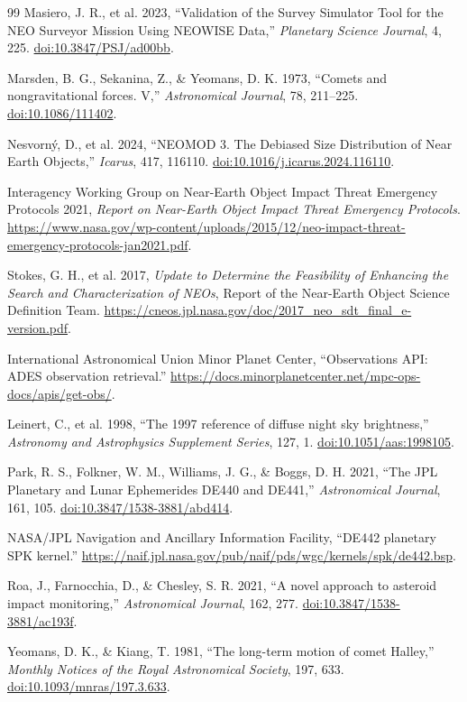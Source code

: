 \begin{thebibliography}{99}
Masiero, J. R., et al. 2023,
``Validation of the Survey Simulator Tool for the NEO Surveyor Mission Using
NEOWISE Data,''
\textit{Planetary Science Journal}, 4, 225.
\href{https://doi.org/10.3847/PSJ/ad00bb}{doi:10.3847/PSJ/ad00bb}.

Marsden, B. G., Sekanina, Z., \& Yeomans, D. K. 1973,
``Comets and nongravitational forces. V,''
\textit{Astronomical Journal}, 78, 211--225.
\href{https://doi.org/10.1086/111402}{doi:10.1086/111402}.

Nesvorn\'y, D., et al. 2024,
``NEOMOD 3. The Debiased Size Distribution of Near Earth Objects,''
\textit{Icarus}, 417, 116110.
\href{https://doi.org/10.1016/j.icarus.2024.116110}{doi:10.1016/j.icarus.2024.116110}.

Interagency Working Group on Near-Earth Object Impact Threat Emergency
Protocols 2021,
\textit{Report on Near-Earth Object Impact Threat Emergency Protocols}.
\url{https://www.nasa.gov/wp-content/uploads/2015/12/neo-impact-threat-emergency-protocols-jan2021.pdf}.

Stokes, G. H., et al. 2017,
\textit{Update to Determine the Feasibility of Enhancing the Search and
Characterization of NEOs},
Report of the Near-Earth Object Science Definition Team.
\url{https://cneos.jpl.nasa.gov/doc/2017_neo_sdt_final_e-version.pdf}.

International Astronomical Union Minor Planet Center,
``Observations API: ADES observation retrieval.''
\url{https://docs.minorplanetcenter.net/mpc-ops-docs/apis/get-obs/}.

Leinert, C., et al. 1998,
``The 1997 reference of diffuse night sky brightness,''
\textit{Astronomy and Astrophysics Supplement Series}, 127, 1.
\href{https://doi.org/10.1051/aas:1998105}{doi:10.1051/aas:1998105}.

Park, R. S., Folkner, W. M., Williams, J. G., \& Boggs, D. H. 2021,
``The JPL Planetary and Lunar Ephemerides DE440 and DE441,''
\textit{Astronomical Journal}, 161, 105.
\href{https://doi.org/10.3847/1538-3881/abd414}{doi:10.3847/1538-3881/abd414}.

NASA/JPL Navigation and Ancillary Information Facility,
``DE442 planetary SPK kernel.''
\url{https://naif.jpl.nasa.gov/pub/naif/pds/wgc/kernels/spk/de442.bsp}.

Roa, J., Farnocchia, D., \& Chesley, S. R. 2021,
``A novel approach to asteroid impact monitoring,''
\textit{Astronomical Journal}, 162, 277.
\href{https://doi.org/10.3847/1538-3881/ac193f}{doi:10.3847/1538-3881/ac193f}.

Yeomans, D. K., \& Kiang, T. 1981,
``The long-term motion of comet Halley,''
\textit{Monthly Notices of the Royal Astronomical Society}, 197, 633.
\href{https://doi.org/10.1093/mnras/197.3.633}{doi:10.1093/mnras/197.3.633}.

\end{thebibliography}


\appendixCfinish
